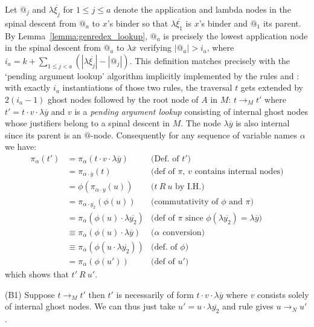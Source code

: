 \documentclass{article}
\theoremstyle{definition}
\def\coresymbol{\pi} %
\begin{document}
\begin{description}
Let $@_j$ and $\lambda\overline{\xi_j}$ for $1\leq j\leq a$ denote the application and lambda nodes in the spinal descent from $@_a$ to $x$'s binder so that $\lambda\overline{\xi_1}$ is $x$'s binder and $@_1$ its parent.
By Lemma~\ref{lemma:genredex_lookup}, $@_a$ is precisely the lowest application node in the spinal descent from $@_a$ to $\lambda\overline{x}$ verifying $|@_a| >  i_a$, where $i_a = k + \sum_{1\leq j< a} (|\lambda\overline{\xi_j}| - |@_j|)$. This definition matches precisely with the `pending argument lookup' algorithm implicitly implemented by the rules  and : with exactly $i_a$ instantiations of those two rules, the traversal $t$ gets extended by $2(i_a-1)$ ghost nodes followed by the root node of $A$ in $M$: $t \rightarrow_M t'$ where $t' = t \cdot v \cdot \lambda\overline{y}$
and $v$ is a \emph{pending argument lookup} consisting of internal ghost nodes whose justifiers belong to a spinal descent in $M$. The node $\lambda\overline{y}$ is also internal since its parent is an $@$-node. Consequently for any sequence of variable names $\alpha$ we have:
\begin{align*}
\coresymbol_\alpha(t') &= \coresymbol_\alpha(t \cdot v \cdot \lambda\overline{y}) & \mbox{(Def.~of $t'$)} \\
                &= \coresymbol_{\alpha \cdot \overline{y}}(t) & \mbox{(def of $\coresymbol$, $v$ contains internal nodes)} \\
                &= \phi(\coresymbol_{\alpha \cdot \overline{y}}(u)) & \mbox{($t~R~u$ by I.H.)}\\
                &= \coresymbol_{\alpha \cdot \overline{y_2}}(\phi(u)) & \mbox{(commutativity of $\phi$ and $\coresymbol$)}\\
                &= \coresymbol_\alpha(\phi(u) \cdot \lambda\overline{y_2}) & \mbox{(def of $\coresymbol$ since $\phi(\lambda\overline{y_2}) = \lambda\overline{y}$)}\\
                &\equiv \coresymbol_\alpha(\phi(u) \cdot \lambda\overline{y}) & \mbox{($\alpha$ conversion)}\\
                &\equiv \coresymbol_\alpha(\phi(u \cdot \lambda\overline{y_2})) & \mbox{(def.~of $\phi$)}\\
                &= \coresymbol_\alpha(\phi(u')) & \mbox{(def of $u'$)}
\end{align*}
which shows that $t'~R~u'$.

(B1) Suppose $t \rightarrow_M t'$ then $t'$ is necessarily of form $t \cdot v\cdot \lambda\overline{y}$ where $v$ consists solely of internal ghost nodes. We can thus just take $u' = u \cdot \lambda\overline{y_2}$ and rule  gives $u \rightarrow_N u'$.


\end{description}
\end{document}
